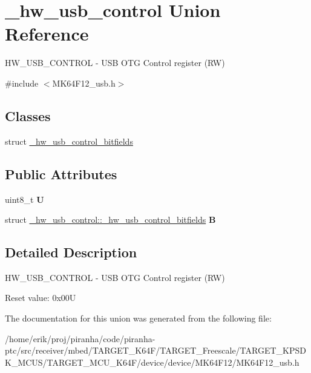 \hypertarget{union__hw__usb__control}{}\section{\+\_\+hw\+\_\+usb\+\_\+control Union Reference}
\label{union__hw__usb__control}


H\+W\+\_\+\+U\+S\+B\+\_\+\+C\+O\+N\+T\+R\+OL -\/ U\+SB O\+TG Control register (RW)  




{\ttfamily \#include $<$M\+K64\+F12\+\_\+usb.\+h$>$}

\subsection*{Classes}
\begin{DoxyCompactItemize}
\item 
struct \hyperlink{struct__hw__usb__control_1_1__hw__usb__control__bitfields}{\+\_\+hw\+\_\+usb\+\_\+control\+\_\+bitfields}
\end{DoxyCompactItemize}
\subsection*{Public Attributes}
\begin{DoxyCompactItemize}
\item 
uint8\+\_\+t {\bfseries U}\hypertarget{union__hw__usb__control_ace817f5a15eb693e4e530ee81d508ba1}{}\label{union__hw__usb__control_ace817f5a15eb693e4e530ee81d508ba1}

\item 
struct \hyperlink{struct__hw__usb__control_1_1__hw__usb__control__bitfields}{\+\_\+hw\+\_\+usb\+\_\+control\+::\+\_\+hw\+\_\+usb\+\_\+control\+\_\+bitfields} {\bfseries B}\hypertarget{union__hw__usb__control_a0f534bea319dc48724ff156489a036c6}{}\label{union__hw__usb__control_a0f534bea319dc48724ff156489a036c6}

\end{DoxyCompactItemize}


\subsection{Detailed Description}
H\+W\+\_\+\+U\+S\+B\+\_\+\+C\+O\+N\+T\+R\+OL -\/ U\+SB O\+TG Control register (RW) 

Reset value\+: 0x00U 

The documentation for this union was generated from the following file\+:\begin{DoxyCompactItemize}
\item 
/home/erik/proj/piranha/code/piranha-\/ptc/src/receiver/mbed/\+T\+A\+R\+G\+E\+T\+\_\+\+K64\+F/\+T\+A\+R\+G\+E\+T\+\_\+\+Freescale/\+T\+A\+R\+G\+E\+T\+\_\+\+K\+P\+S\+D\+K\+\_\+\+M\+C\+U\+S/\+T\+A\+R\+G\+E\+T\+\_\+\+M\+C\+U\+\_\+\+K64\+F/device/device/\+M\+K64\+F12/M\+K64\+F12\+\_\+usb.\+h\end{DoxyCompactItemize}
